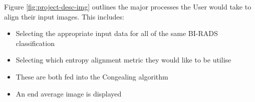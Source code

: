 Figure \ref{fig:project-desc-img} outlines the major processes the User would take to align their input images. This includes:

\begin{itemize}
  \item Selecting the appropriate input data for all of  the same BI-RADS classification
  \item Selecting which entropy alignment metric they would like to be utilise
  \item These are both fed into the \Gls{Congealing} algorithm
  \item An end average image is displayed
\end{itemize}
